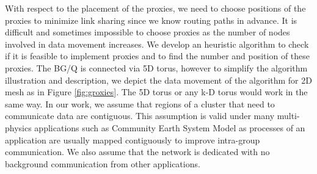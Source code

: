With respect to the placement of the proxies, we need to choose positions of the proxies to minimize link sharing since we know routing paths in advance. It is difficult and sometimes impossible to choose proxies as the number of nodes involved in data movement increases. We develop an heuristic algorithm to check if it is feasible to implement proxies and to find the number and position of these proxies. The BG/Q is connected via 5D torus, however to simplify the algorithm illustration and description, we depict the data movement of the algorithm for 2D mesh as in Figure \ref{fig:groxies}. The 5D torus or any k-D torus would work in the same way. In our work, we assume that regions of a cluster that need to communicate data are contiguous. This assumption is valid under many multi-physics applications such as Community Earth System Model \cite{CESM:Collins} as processes of an application are usually mapped contiguously to improve intra-group communication. We also assume that the network is dedicated with no background communication from other applications.

